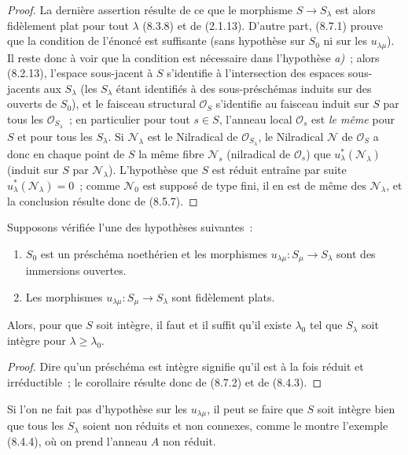 \begin{proof}
La dernière assertion résulte de ce que le morphisme $S\to S_\lambda$ est
alors fidèlement plat pour tout $\lambda$ (8.3.8) et de (2.1.13). D'autre part,
(8.7.1) prouve que la condition de l'énoncé est suffisante (sans hypothèse sur
$S_0$ ni sur les $u_{\lambda\mu}$). Il reste donc à voir que la condition est
nécessaire dans l'hypothèse \emph{a)}~; alors (8.2.13), l'espace sous-jacent à
$S$ s'identifie à l'intersection des espaces sous-jacents aux $S_\lambda$ (les
$S_\lambda$ étant identifiés à des sous-préschémas induits sur des ouverts de
$S_0$), et le faisceau structural $\mathcal O_S$ s'identifie au
faisceau induit sur $S$ par tous les $\mathcal O_{S_\lambda}$~; en particulier
pour tout $s\in S$, l'anneau local $\mathcal O_s$ est \emph{le même} pour $S$
et pour tous les $S_\lambda$. Si $\mathcal N_\lambda$ est le Nilradical de
$\mathcal O_{S_\lambda}$, le Nilradical $\mathcal N$ de $\mathcal O_S$ a donc
en chaque point de $S$ la même fibre $\mathcal N_s$ (nilradical de
$\mathcal O_s$) que $u_\lambda^*(\mathcal N_\lambda)$ (induit sur $S$ par
$\mathcal N_\lambda$). L'hypothèse que $S$ est réduit entraîne par suite
$u_\lambda^*(\mathcal N_\lambda)=0$~; comme $\mathcal N_0$ est supposé de
type fini, il en est de même des $\mathcal N_\lambda$, et la conclusion résulte
donc de (8.5.7).
\end{proof}

\begin{corollary}[8.7.3]
\label{IV.8.7.3-fr}
Supposons vérifiée l'une des hypothèses suivantes~:
\begin{enumerate}
\item[\emph{a)}] $S_0$ est un préschéma noethérien et les morphismes
$u_{\lambda\mu}:S_\mu\to S_\lambda$ sont des immersions ouvertes.
\item[\emph{b)}] Les morphismes $u_{\lambda\mu}:S_\mu\to S_\lambda$ sont
fidèlement plats.
\end{enumerate}
Alors, pour que $S$ soit intègre, il faut et il suffit qu'il existe
$\lambda_0$ tel que $S_\lambda$ soit intègre pour $\lambda\geq\lambda_0$.
\end{corollary}

\begin{proof}
Dire qu'un préschéma est intègre signifie qu'il est à la fois réduit et
irréductible~; le corollaire résulte donc de (8.7.2) et de (8.4.3).
\end{proof}

\begin{remark}[8.7.4]
\label{IV.8.7.4-fr}
Si l'on ne fait pas d'hypothèse sur les $u_{\lambda\mu}$, il peut se faire que
$S$ soit intègre bien que tous les $S_\lambda$ soient non réduits et non
connexes, comme le montre l'exemple (8.4.4), où on prend l'anneau $A$ non
réduit.
\end{remark}

